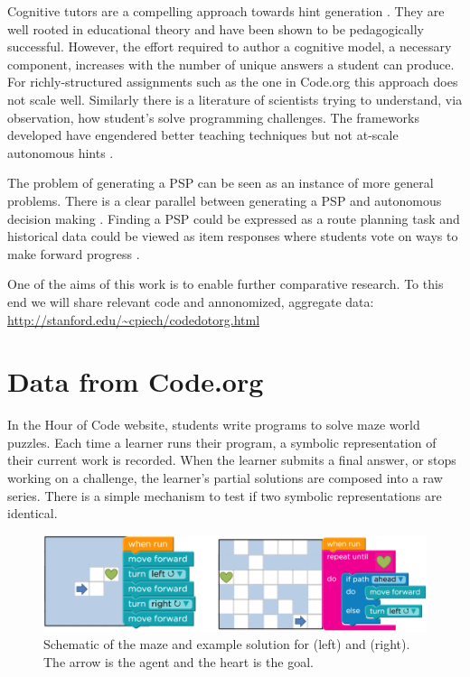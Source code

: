 Cognitive tutors are a compelling approach towards hint generation  \cite{ritter2007cognitive} \cite{aleven2002effective}. They are well rooted in educational theory and have been shown to be pedagogically successful. However, the effort required to author a cognitive model, a necessary component, increases with the number of unique answers a student can produce. For richly-structured assignments such as the one in Code.org this approach does not scale well. Similarly there is a literature of scientists trying to understand, via observation, how student's solve programming challenges. The frameworks developed have engendered better teaching techniques but not at-scale autonomous hints \cite{fitzgerald2008debugging} \cite{ahmadzadeh2005analysis}.

The problem of generating a PSP can be seen as an instance of more general problems. There is a clear parallel between generating a PSP and autonomous decision making \cite{puterman2009markov}. Finding a PSP could be expressed as a route planning task \cite{szczerba2000robust} and historical data could be viewed as item responses where students vote on ways to make forward progress \cite{whitehill2009whose}.  

One of the aims of this work is to enable further comparative research. To this end we will share relevant code and annonomized, aggregate data:
\url{http://stanford.edu/~cpiech/codedotorg.html}

\section{Data from Code.org}





In the Hour of Code website, students write programs to solve maze world puzzles. Each time a learner runs their program, a symbolic representation of their current work is recorded. When the learner submits a final answer, or stops working on a challenge, the learner’s partial solutions are composed into a raw series. There is a simple mechanism to test if two symbolic representations are identical.

\begin{figure}[h]
	\centering
	\includegraphics[width=0.8\columnwidth]{img/problems3.png}

	\caption[Schematic of Code.org problems]{Schematic of the maze and example solution for \Pa (left) and \Pb (right). The arrow is the agent and the heart is the goal.}
	\label{fig:hocExample}
\end{figure}

